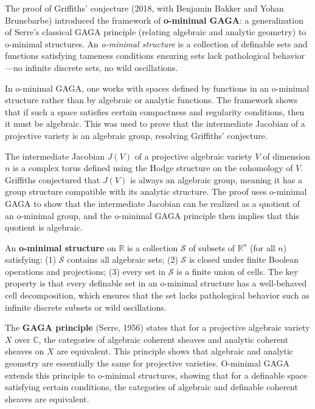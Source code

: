 The proof of Griffiths' conjecture (2018, with Benjamin Bakker and Yohan Brunebarbe) introduced the framework of \textbf{o-minimal GAGA}: a generalization of Serre's classical GAGA principle (relating algebraic and analytic geometry) to o-minimal structures. An \emph{o-minimal structure} is a collection of definable sets and functions satisfying tameness conditions ensuring sets lack pathological behavior---no infinite discrete sets, no wild oscillations.

In o-minimal GAGA, one works with spaces defined by functions in an o-minimal structure rather than by algebraic or analytic functions. The framework shows that if such a space satisfies certain compactness and regularity conditions, then it must be algebraic. This was used to prove that the intermediate Jacobian of a projective variety is an algebraic group, resolving Griffiths' conjecture.

The intermediate Jacobian $J(V)$ of a projective algebraic variety $V$ of dimension $n$ is a complex torus defined using the Hodge structure on the cohomology of $V$. Griffiths conjectured that $J(V)$ is always an algebraic group, meaning it has a group structure compatible with its analytic structure. The proof uses o-minimal GAGA to show that the intermediate Jacobian can be realized as a quotient of an o-minimal group, and the o-minimal GAGA principle then implies that this quotient is algebraic.

An \textbf{o-minimal structure} on $\mathbb{R}$ is a collection $\mathcal{S}$ of subsets of $\mathbb{R}^n$ (for all $n$) satisfying: (1) $\mathcal{S}$ contains all algebraic sets; (2) $\mathcal{S}$ is closed under finite Boolean operations and projections; (3) every set in $\mathcal{S}$ is a finite union of cells. The key property is that every definable set in an o-minimal structure has a well-behaved cell decomposition, which ensures that the set lacks pathological behavior such as infinite discrete subsets or wild oscillations.

The \textbf{GAGA principle} (Serre, 1956) states that for a projective algebraic variety $X$ over $\mathbb{C}$, the categories of algebraic coherent sheaves and analytic coherent sheaves on $X$ are equivalent. This principle shows that algebraic and analytic geometry are essentially the same for projective varieties. O-minimal GAGA extends this principle to o-minimal structures, showing that for a definable space satisfying certain conditions, the categories of algebraic and definable coherent sheaves are equivalent.

